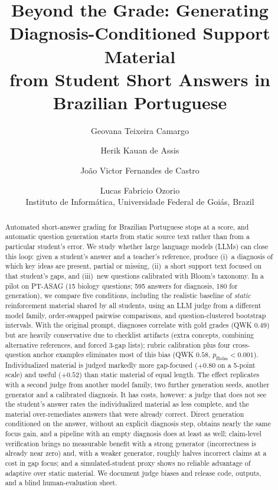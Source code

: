 \documentclass[11pt]{article}
\title{Beyond the Grade: Generating Diagnosis-Conditioned Support Material\\
from Student Short Answers in Brazilian Portuguese}
\author{
  Geovana Teixeira Camargo \and Herik Kauan de Assis \and Jo\~ao Victor Fernandes de Castro \and Lucas Fabricio Ozorio \\
  Instituto de Inform\'atica, Universidade Federal de Goi\'as, Brazil}
\begin{document}
\maketitle

\begin{abstract}
Automated short-answer grading for Brazilian Portuguese stops at a score, and automatic question generation starts from static source text rather than from a particular student's error.
We study whether large language models (LLMs) can close this loop: given a student's answer and a teacher's reference, produce (i)~a diagnosis of which key ideas are present, partial or missing, (ii)~a short support text focused on that student's gaps, and (iii)~new questions calibrated with Bloom's taxonomy.
In a pilot on PT-ASAG (15 biology questions; 595 answers for diagnosis, 180 for generation), we compare five conditions, including the realistic baseline of \emph{static} reinforcement material shared by all students, using an LLM judge from a different model family, order-swapped pairwise comparisons, and question-clustered bootstrap intervals.
With the original prompt, diagnoses correlate with gold grades (QWK $0.49$) but are heavily conservative due to checklist artifacts (extra concepts, combining alternative references, and forced 3-gap lists); rubric calibration plus four cross-question anchor examples eliminates most of this bias (QWK $0.58$, $p_{\text{Holm}}{<}0.001$).
Individualized material is judged markedly more gap-focused ($+0.80$ on a 5-point scale) and useful ($+0.52$) than static material of equal length. The effect replicates with a second judge from another model family, two further generation seeds, another generator and a calibrated diagnosis. It has costs, however: a judge that does not see the student's answer rates the individualized material as less complete, and the material over-remediates answers that were already correct.
Direct generation conditioned on the answer, without an explicit diagnosis step, obtains nearly the same focus gain, and a pipeline with an empty diagnosis does at least as well; claim-level verification brings no measurable benefit with a strong generator (incorrectness is already near zero) and, with a weaker generator, roughly halves incorrect claims at a cost in gap focus; and a simulated-student proxy shows no reliable advantage of adaptive over static material.
We document judge biases and release code, outputs, and a blind human-evaluation sheet.
\end{abstract}

\end{document}
